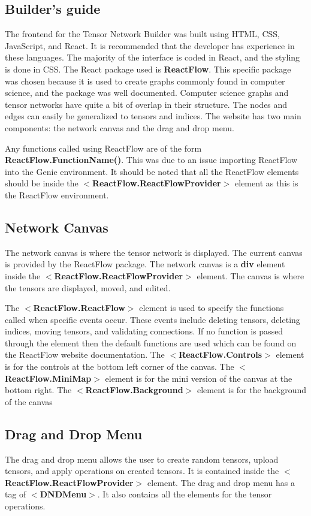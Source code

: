 \documentclass{juliacon}
\begin{document}
\begin{appendix}
\section{Builder's guide}
The frontend for the Tensor Network Builder was built using HTML, CSS, JavaScript, and React. It is recommended that the developer has experience in these languages. The majority of the interface is coded in React, and the styling is done in CSS. The React package used is \textbf{ReactFlow}. This specific package was chosen because it is used to create graphs commonly found in computer science, and the package was well documented. Computer science graphs and tensor networks have quite a bit of overlap in their structure. The nodes and edges can easily be generalized to tensors and indices. The website has two main components: the network canvas and the drag and drop menu.

Any functions called using ReactFlow are of the form \textbf{ReactFlow.FunctionName()}. This was due to an issue importing ReactFlow into the Genie environment. It should be noted that all the ReactFlow elements should be inside the $<$\textbf{ReactFlow.ReactFlowProvider}$>$ element as this is the ReactFlow environment. 

\subsection{Network Canvas}

The network canvas is where the tensor network is displayed. The current canvas is provided by the ReactFlow package. The network canvas is a \textbf{div} element inside the $<$\textbf{ReactFlow.ReactFlowProvider}$>$ element. The canvas is where the tensors are displayed, moved, and edited.

The $<$\textbf{ReactFlow.ReactFlow}$>$ element is used to specify the functions called when specific events occur. These events include deleting tensors, deleting indices, moving tensors, and validating connections. If no function is passed through the element then the default functions are used which can be found on the ReactFlow website documentation. The $<$\textbf{ReactFlow.Controls}$>$ element is for the controls at the bottom left corner of the canvas. The $<$\textbf{ReactFlow.MiniMap}$>$ element is for the mini version of the canvas at the bottom right. The $<$\textbf{ReactFlow.Background}$>$ element is for the background of the canvas


\subsection{Drag and Drop Menu}
The drag and drop menu allows the user to create random tensors, upload tensors, and apply operations on created tensors. It is contained inside the $<$\textbf{ReactFlow.ReactFlowProvider}$>$ element. The drag and drop menu has a tag of $<$\textbf{DNDMenu}$>$. It also contains all the elements for the tensor operations.


\end{appendix}
\end{document}
